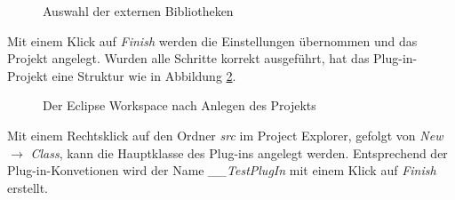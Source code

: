 \begin{figure}[H]
  \vspace{0.5cm}
  \centering
  \caption{Auswahl der externen Bibliotheken}
  \label{libs}
  \vspace{0.5cm}
\end{figure}

Mit einem Klick auf \textit{Finish} werden die Einstellungen übernommen und das Projekt angelegt. Wurden alle Schritte korrekt ausgeführt, hat das Plug-in-Projekt eine Struktur wie in Abbildung \ref{workspace}.

\begin{figure}[H]
  \vspace{0.5cm}
  \centering
  \caption{Der Eclipse Workspace nach Anlegen des Projekts}
  \label{workspace}
  \vspace{0.5cm}
\end{figure}

Mit einem Rechtsklick auf den Ordner \textit{src} im Project Explorer, gefolgt von \textit{New} $\rightarrow$ \textit{Class}, kann die Hauptklasse des Plug-ins angelegt werden. Entsprechend der Plug-in-Konvetionen wird der Name \textit{\_\_TestPlugIn} mit einem Klick auf \textit{Finish} erstellt.

